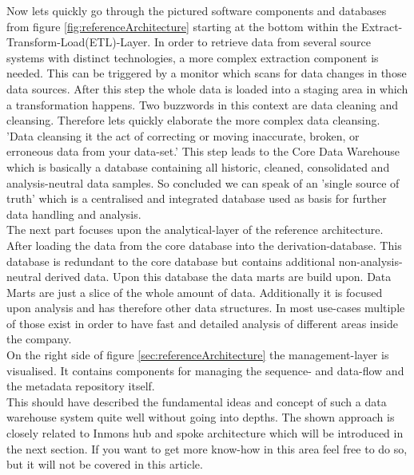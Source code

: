 Now lets quickly go through the pictured software components and databases from figure \ref{fig:referenceArchitecture} starting at the bottom within the Extract-Transform-Load(ETL)-Layer. In order to retrieve data from several source systems with distinct technologies, a more complex extraction component is needed. This can be triggered by a monitor which scans for data changes in those data sources.\newline
After this step the whole data is loaded into a staging area in which a transformation happens. Two buzzwords in this context are data cleaning and cleansing. Therefore lets quickly elaborate the more complex data cleansing. 
'Data cleansing it the act of correcting or moving inaccurate, broken, or erroneous data from your data-set.'\cite{dataCleansing}
This step leads to the Core Data Warehouse which is basically a database containing all historic, cleaned, consolidated and analysis-neutral data samples. So concluded we can speak of an 'single source of truth'\cite{scriptRasch} which is a centralised and integrated database used as basis for further data handling and analysis.\newline
\\
The next part focuses upon the analytical-layer of the reference architecture. After loading the data from the core database into the derivation-database. This database is redundant to the core database but contains additional non-analysis-neutral derived data. Upon this database the data marts are build upon. Data Marts are just a slice of the whole amount of data. Additionally it is focused upon analysis and has therefore other data structures. In most use-cases multiple of those exist in order to have fast and detailed analysis of different areas inside the company.\newline
\\
On the right side of figure \ref{sec:referenceArchitecture} the management-layer is visualised. It contains components for managing the sequence- and data-flow and the metadata repository itself.\newline
\\
This should have described the fundamental ideas and concept of such a data warehouse system quite well without going into depths. The shown approach is closely related to Inmons hub and spoke architecture which will be introduced in the next section. If you want to get more know-how in this area feel free to do so, but it will not be covered in this article. 
